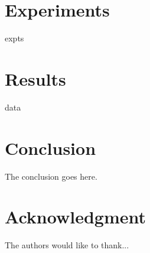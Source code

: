 \documentclass[conference]{IEEEtran}
\begin{document}
\section{Experiments}
expts

\section{Results}
data

\section{Conclusion}
The conclusion goes here.

\section*{Acknowledgment}

The authors would like to thank...

\nocite{*}


\end{document}
